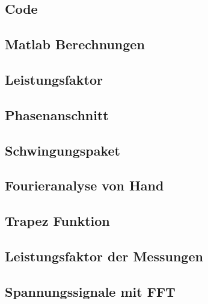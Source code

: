 \begin{appendix} %
\section{Code}
\subsection{Matlab Berechnungen}
\subsection*{Leistungsfaktor}\label{sec:Leistungsfaktor_Berechnung}


\subsection*{Phasenanschnitt}\label{sec:Phasenanschnitt_Berechnung}


\subsection*{Schwingungspaket}\label{sec:Schwingungspaket_Berechnung}


\subsection*{Fourieranalyse von Hand}\label{sec:Fourieranalyse_Berechnung}


\subsection*{Trapez Funktion}\label{sec:Trapez_Berechnung}


\subsection*{Leistungsfaktor der Messungen}\label{sec:Leistungsfaktor_Messungen}


\subsection*{Spannungssignale mit FFT}\label{sec:Spannungen_Messungen}



\end{appendix}
